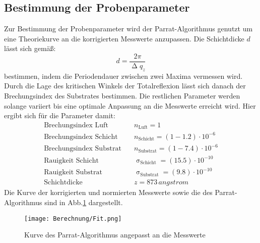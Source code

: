 \subsection{Bestimmung der Probenparameter}
Zur Bestimmung der Probenparameter wird der Parrat-Algorithmus genutzt um eine Theoriekurve an die  korrigierten Messwerte anzupassen. Die Schichtdicke $d$ lässt sich gemäß:
\begin{equation}
d=\frac{2\pi}{\upDelta q_z}
\end{equation}
bestimmen, indem die Periodendauer zwischen zwei Maxima vermessen wird. Durch die Lage des kritischen Winkels der Totalreflexion lässt sich danach der Brechungsindex des Substrates bestimmen. Die restlichen Parameter werden solange variiert bis eine optimale Anpassung an die Messwerte erreicht wird. Hier ergibt sich für die Parameter damit:
\begin{align}
  \text{Brechungsindex Luft}&\quad n_\text{Luft}=1\\
  \text{Brechungsindex Schicht}&\quad n_\text{Schicht}= \left(1-1.2\right)\cdot10^{-6}\\
  \text{Brechungsindex Substrat}&\quad n_\text{Substrat}=\left(1-7.4\right)\cdot10^{-6}\\
  \text{Rauigkeit Schicht}&\quad \upsigma_\text{Schicht}=\left(15.5\right)\cdot10^{-10}\\
  \text{Rauigkeit Substrat}&\quad \upsigma_\text{Substrat}=\left(9.8\right)\cdot10^{-10}\\
  \text{Schichtdicke}&\quad z=873\,\si{angstrom}
\end{align}
Die Kurve der korrigierten und normierten Messwerte sowie die des Parrat-Algorithmus sind in Abb.\ref{fit} dargestellt.
\begin{figure}[H]
  \centering
  \texttt{[image: Berechnung/Fit.png]}
  \caption{Kurve des Parrat-Algorithmus angepasst an die Messwerte}
  \label{fit}
\end{figure}
